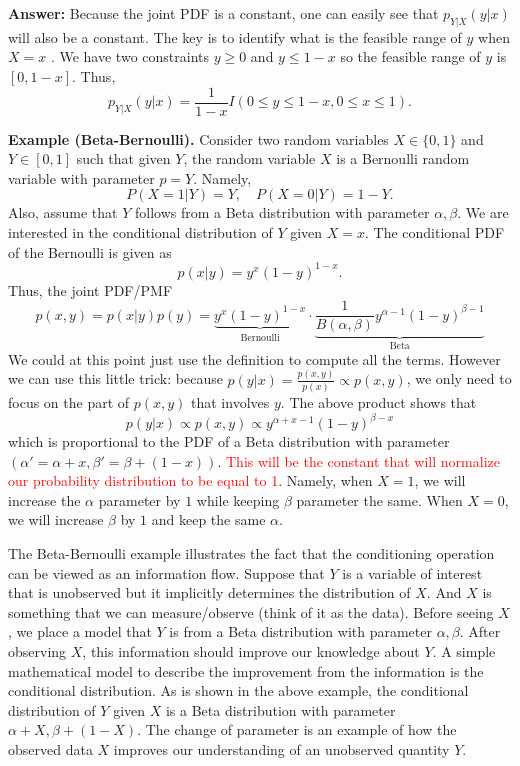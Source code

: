 \documentclass[twoside]{article}
\newcommand{\note}[1]{\textcolor{red}{#1}}
\begin{document}
{\bf Answer:} Because the joint PDF is a constant, one can easily see that $p_{Y|X}(y|x)$
will also be a constant.
The key is to identify what is the feasible range of $y$ when $X=x$ .
We have two constraints $y\geq 0$ and $y\leq 1-x$
so the feasible range of $y$ is $[0,1-x]$.
Thus, 
$$
p_{Y|X}(y|x) = \frac{1}{1-x} I(0\leq y\leq 1-x, 0\leq x\leq 1).
    $$


{\bf Example (Beta-Bernoulli).}
Consider two random variables $X\in\{0,1\}$ and $Y\in[0,1]$ such that 
given $Y$, the random variable $X$ is a Bernoulli random variable with parameter $p=Y$. 
Namely, 
$$
P(X=1|Y) = Y,\quad P(X=0|Y) = 1-Y.
$$
Also, assume that $Y$ follows from a Beta distribution with parameter $\alpha,\beta$. 
We are interested in the conditional distribution of $Y$ given $X=x$.
The conditional PDF of the Bernoulli is given as 
$$
p(x|y) = y^x(1-y)^{1-x}. 
$$
Thus, the joint PDF/PMF
$$
p(x,y) = p(x|y) p(y) = \underbrace{y^x(1-y)^{1-x}}_{\mbox{Bernoulli}} \cdot\underbrace{\frac{1}{B(\alpha,\beta)}y^{\alpha-1}(1-y)^{\beta-1}}_{\mbox{Beta}}
$$ 
We could at this point just use the definition to compute all the terms. However we can use this little trick: because $p(y|x) = \frac{p(x,y)}{p(x)}\propto p(x,y)$,
we only need to focus on the part of $p(x,y)$ that involves $y$. 
The above product shows that 
$$
p(y|x) \propto p(x,y) \propto y^{\alpha+x-1}(1-y)^{\beta-x}
$$
which is proportional to the PDF of a  Beta distribution with parameter $(\alpha' = \alpha+x, \beta' = \beta+(1-x))$. \note{This will be the constant that will normalize our probability distribution to be equal to 1}. 
Namely, when $X=1$, we will increase the $\alpha$ parameter by $1$
while keeping $\beta$ parameter the same. 
When $X=0$, we will increase $\beta$ by $1$ and keep the same $\alpha$.


The Beta-Bernoulli example illustrates the fact that the conditioning operation can be viewed 
as an information flow.
Suppose that  $Y$ is a variable of interest that is unobserved 
but it implicitly determines the distribution of $X$.
And $X$ is something that we can measure/observe (think of it as the data).
Before seeing $X$, we place a model that $Y$ is from a Beta distribution with parameter $\alpha,\beta$.
After observing $X$, this information should improve our knowledge about $Y$. 
A simple mathematical model to describe the improvement from the information is the conditional distribution. 
As is shown in the above example, the conditional distribution of $Y$ given $X$
is
a Beta distribution with parameter $\alpha+X, \beta+(1-X)$.
The change of parameter is an example of how the observed data $X$
improves our understanding of an unobserved quantity $Y$. 
\end{document}
